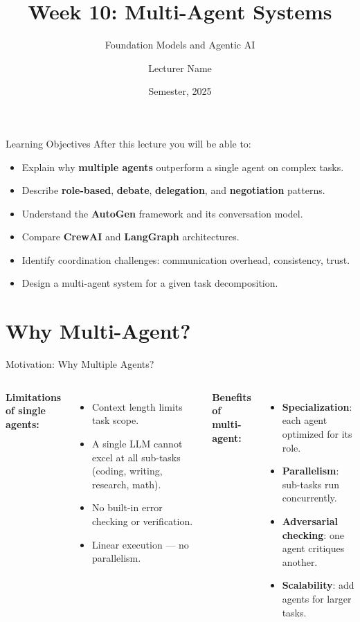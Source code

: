 \documentclass[aspectratio=169,10pt]{beamer}
\title{Week 10: Multi-Agent Systems}
\subtitle{Foundation Models and Agentic AI}
\author{Lecturer Name}
\institute{Holon Institute of Technology (HIT)}
\date{Semester, 2025}
\begin{document}
\begin{frame}
  \titlepage
\end{frame}

\begin{frame}{Learning Objectives}
  After this lecture you will be able to:
  \begin{itemize}
    \item Explain why \textbf{multiple agents} outperform a single agent on complex tasks.
    \item Describe \textbf{role-based}, \textbf{debate}, \textbf{delegation}, and \textbf{negotiation} patterns.
    \item Understand the \textbf{AutoGen} framework and its conversation model.
    \item Compare \textbf{CrewAI} and \textbf{LangGraph} architectures.
    \item Identify coordination challenges: communication overhead, consistency, trust.
    \item Design a multi-agent system for a given task decomposition.
  \end{itemize}
\end{frame}

\section{Why Multi-Agent?}

\begin{frame}{Motivation: Why Multiple Agents?}
  \begin{columns}[T]
      \textbf{Limitations of single agents:}
      \begin{itemize}
        \item Context length limits task scope.
        \item A single LLM cannot excel at all sub-tasks (coding, writing, research, math).
        \item No built-in error checking or verification.
        \item Linear execution — no parallelism.
      \end{itemize}
      \vspace{0.4em}
      \textbf{Benefits of multi-agent:}
      \begin{itemize}
        \item \textbf{Specialization}: each agent optimized for its role.
        \item \textbf{Parallelism}: sub-tasks run concurrently.
        \item \textbf{Adversarial checking}: one agent critiques another.
        \item \textbf{Scalability}: add agents for larger tasks.
      \end{itemize}
      
  \end{columns}
\end{frame}
\end{document}
